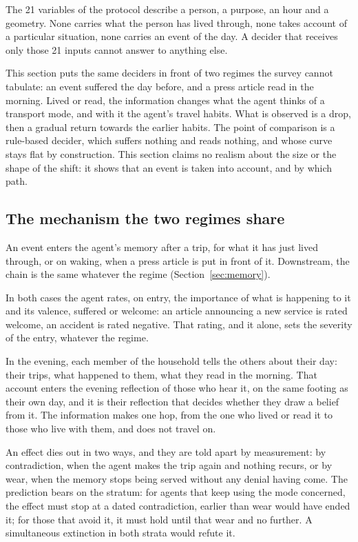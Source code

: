 The 21 variables of the protocol describe a person, a purpose, an hour and a geometry. None carries what the person has lived through, none takes account of a particular situation, none carries an event of the day. A decider that receives only those 21 inputs cannot answer to anything else.

This section puts the same deciders in front of two regimes the survey cannot tabulate: an event suffered the day before, and a press article read in the morning. Lived or read, the information changes what the agent thinks of a transport mode, and with it the agent's travel habits. What is observed is a drop, then a gradual return towards the earlier habits. The point of comparison is a rule-based decider, which suffers nothing and reads nothing, and whose curve stays flat by construction. This section claims no realism about the size or the shape of the shift: it shows that an event is taken into account, and by which path.

\subsection{The mechanism the two regimes share}
\label{sec:mechanism}

An event enters the agent's memory after a trip, for what it has just lived through, or on waking, when a press article is put in front of it. Downstream, the chain is the same whatever the regime (Section~\ref{sec:memory}).

In both cases the agent rates, on entry, the importance of what is happening to it and its valence, suffered or welcome: an article announcing a new service is rated welcome, an accident is rated negative. That rating, and it alone, sets the severity of the entry, whatever the regime.

In the evening, each member of the household tells the others about their day: their trips, what happened to them, what they read in the morning. That account enters the evening reflection of those who hear it, on the same footing as their own day, and it is their reflection that decides whether they draw a belief from it. The information makes one hop, from the one who lived or read it to those who live with them, and does not travel on.

An effect dies out in two ways, and they are told apart by measurement: by contradiction, when the agent makes the trip again and nothing recurs, or by wear, when the memory stops being served without any denial having come. The prediction bears on the stratum: for agents that keep using the mode concerned, the effect must stop at a dated contradiction, earlier than wear would have ended it; for those that avoid it, it must hold until that wear and no further. A simultaneous extinction in both strata would refute it.

